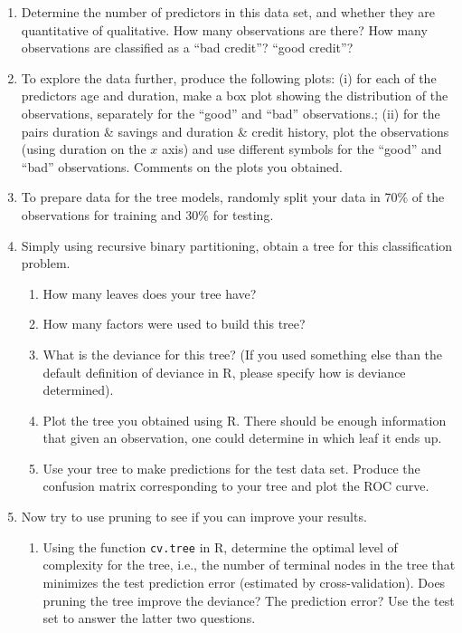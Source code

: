 \documentclass[11pt]{article}
\begin{document}
\begin{enumerate}
\item Determine the number of predictors in this data set, and whether they are quantitative of qualitative. How many observations are there? How many observations are classified as a ``bad credit''? ``good credit''? 
\item To explore the data further, produce the following plots: (i) for each of the predictors age and duration, make a box plot showing the distribution of the observations, separately for the ``good'' and ``bad'' observations.; (ii) for the pairs duration \& savings and duration \& credit history, plot the observations (using duration on the $x$ axis) and use different symbols for the ``good'' and ``bad'' observations. Comments on the plots you obtained.
\item To prepare data for the tree models, randomly split your data in 70\% of the observations for training and 30\% for testing.
\item Simply using recursive binary partitioning, obtain a tree for this classification problem.
  \begin{enumerate}
  \item How many leaves does your tree have?
    \item How many factors were used to build this tree?
  \item What is the deviance for this tree? (If you used something else than the default definition of deviance in R, please specify how is deviance determined).
  \item Plot the tree you obtained using R. There should be enough information that given an observation, one could determine in which leaf it ends up. %
    \item Use your tree to make predictions for the test data set. Produce the confusion matrix corresponding to your tree and plot the ROC curve.
  \end{enumerate}
\item Now try to use pruning to see if you can improve your results.
  \begin{enumerate}
  \item Using the function {\tt cv.tree} in R,  determine the optimal level of complexity for the tree, i.e., the number of terminal nodes in the tree that minimizes the test prediction error (estimated by cross-validation). Does pruning the tree improve the deviance? The prediction error? Use the test set to answer the latter two questions.

\end{enumerate}
\end{enumerate}
\end{document}
